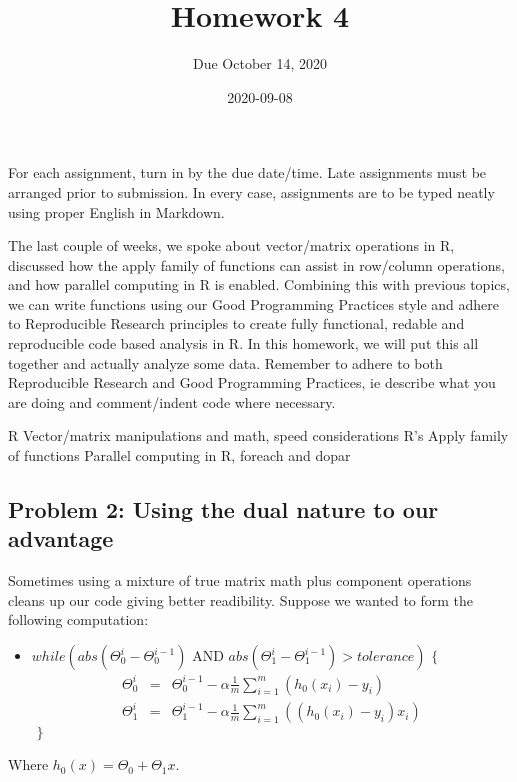 \documentclass[]{article}
\title{Homework 4}
\subtitle{Due October 14, 2020}
\author{}
\date{\vspace{-2.5em}2020-09-08}
\begin{document}
\maketitle

For each assignment, turn in by the due date/time. Late assignments must
be arranged prior to submission. In every case, assignments are to be
typed neatly using proper English in Markdown.

The last couple of weeks, we spoke about vector/matrix operations in R,
discussed how the apply family of functions can assist in row/column
operations, and how parallel computing in R is enabled. Combining this
with previous topics, we can write functions using our Good Programming
Practices style and adhere to Reproducible Research principles to create
fully functional, redable and reproducible code based analysis in R. In
this homework, we will put this all together and actually analyze some
data. Remember to adhere to both Reproducible Research and Good
Programming Practices, ie describe what you are doing and comment/indent
code where necessary.

R Vector/matrix manipulations and math, speed considerations R's Apply
family of functions Parallel computing in R, foreach and dopar

\hypertarget{problem-2-using-the-dual-nature-to-our-advantage}{%
\subsection{Problem 2: Using the dual nature to our
advantage}\label{problem-2-using-the-dual-nature-to-our-advantage}}

Sometimes using a mixture of true matrix math plus component operations
cleans up our code giving better readibility. Suppose we wanted to form
the following computation:

\begin{itemize}
    \item $while(abs(\Theta_0^{i}-\Theta_0^{i-1}) \text{ AND } abs(\Theta_1^{i}-\Theta_1^{i-1}) > tolerance) \text{ \{ }$
    \begin{eqnarray*}
        \Theta_0^i &=& \Theta_0^{i-1} - \alpha\frac{1}{m}\sum_{i=1}^{m} (h_0(x_i) -y_i)  \\
        \Theta_1^i &=& \Theta_1^{i-1} - \alpha\frac{1}{m}\sum_{i=1}^{m} ((h_0(x_i) -y_i)x_i) 
    \end{eqnarray*}
    $\text{ \} }$
\end{itemize}

Where \(h_0(x) = \Theta_0 + \Theta_1x\).
\end{document}
